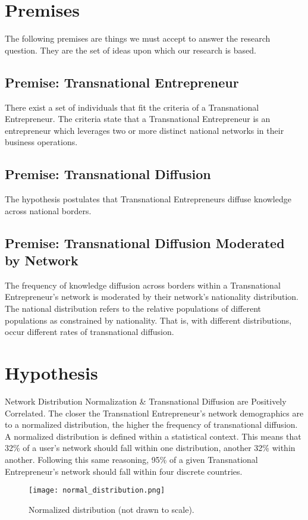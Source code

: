 \section{Premises}
The following premises are things we must accept to answer the
research question. They are the set of ideas upon which our research
is based.

\subsection{Premise: Transnational Entrepreneur}
There exist a set of individuals that fit the criteria of a
Transnational Entrepreneur. The criteria state that a Transnational
Entrepreneur is an entrepreneur which leverages two or more distinct
national networks in their business operations.

\subsection{Premise: Transnational Diffusion}
The hypothesis postulates that Transnational Entrepreneurs diffuse
knowledge across national borders.

\subsection{Premise: Transnational Diffusion Moderated by Network}
The frequency of knowledge diffusion across borders within a
Transnational Entrepreneur's network is moderated by their network's
nationality distribution. The national distribution refers to the
relative populations of different populations as constrained by
nationality. That is, with different distributions, occur different
rates of transnational diffusion.

\section{Hypothesis}
Network Distribution Normalization \& Transnational Diffusion are
Positively Correlated. The closer the Transnationl Entrepreneur's
network demographics are to a normalized distribution, the higher the
frequency of transnational diffusion. A normalized distribution is
defined within a statistical context. This means that 32\% of a user's
network should fall within one distribution, another 32\% within
another. Following this same reasoning, 95\% of a given Transnational
Entrepreneur's network should fall within four discrete countries.
\begin{figure}[!ht]
  \centering
  \texttt{[image: normal\_distribution.png]}
  \caption{Normalized distribution (not drawn to scale).}
\end{figure}
